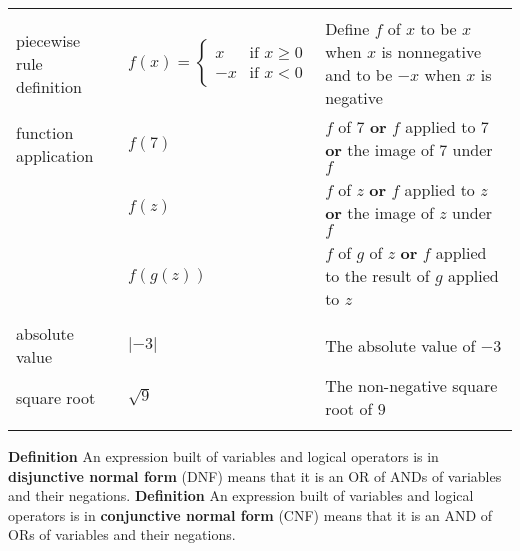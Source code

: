 \documentclass[12pt, oneside]{article}
\begin{document}
\begin{center}
\begin{tabular}{|llp{9.8cm}|}
&&\\
piecewise rule definition & $f(x) = \begin{cases} x & \text{if~}x \geq 0 \\ -x & \text{if~}x<0\end{cases}$ &
Define $f$ of $x$ to be $x$ when $x$ is nonnegative and to be $-x$ when $x$ is negative\\
function application & $f(7)$ & $f$ of $7$ {\bf or} $f$ applied to $7$ {\bf or} the image of $7$ under $f$\\
                     & $f(z)$ & $f$ of $z$ {\bf or} $f$ applied to $z$ {\bf or} the image of $z$ under $f$\\
                     & $f(g(z))$ & $f$ of $g$ of $z$ {\bf or} $f$ applied to the result of $g$ applied to $z$ \\
&&\\
absolute value & $\lvert -3 \rvert$ & The absolute value of $-3$ \\
square root & $\sqrt{9}$ & The non-negative square root of $9$ \\
&&\\
\hline
\end{tabular}
\end{center}
{\bf  Definition} An expression built of variables and logical 
operators is in {\bf disjunctive normal form}  (DNF) means
that it is an OR of ANDs of variables and their negations.
{\bf  Definition} An expression built of variables and logical 
operators is in {\bf conjunctive normal form}  (CNF) means
that it is an AND of ORs of variables and their negations.
\end{document}
